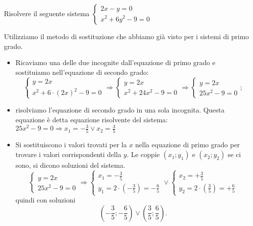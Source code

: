 \begin{esempio}{}{}
Risolvere il seguente sistema 
\(\left\{\begin{array}{l}{2x-y=0}\\{x^2+6y^2-9=0}\end{array}\right.\)

Utilizziamo il metodo di sostituzione che abbiamo già visto per i sistemi 
di primo grado.

\begin{itemize}
\item Ricaviamo una delle due incognite dall'equazione di primo grado e 
sostituiamo nell'equazione di secondo grado:
\[\left \{\begin{array}{l}y=2x \\
x^2+6 \cdot (2x)^2-9=0\end{array}\right. 
\Rightarrow \left \{\begin{array}{l}y=2x \\
x^2+24x^2-9=0\end{array}\right. 
\Rightarrow \left\{\begin{array}{l}y=2x \\
25x^2-9=0\end{array}\right.;\]
\item risolviamo l'equazione di secondo grado in una sola incognita. Questa equazione è detta equazione risolvente del sistema:
 \(25x^2-9=0\Rightarrow x_1=-\frac 3 5\vee x_2=\frac 3 5\)
\item Si sostituiscono i valori trovati per la \( x \) nella equazione di primo grado per trovare i valori corrispondenti della \( y \). Le coppie \((x_1;y_1)\) e \((x_2;y_2)\) se ci sono, si dicono soluzioni del sistema.
\[\left\{\begin{array}{l}{y=2x}\\
{25x^2-9=0}\end{array}\right. 
\Rightarrow \left\{\begin{array}{l}x_1=-\frac 3 5 \\
y_1=2\cdot \left(-\frac 3 5\right)=-\frac 6 5\end{array}\right.\vee 
\left\{\begin{array}{l}x_2=+\frac 3 5 \\
y_2=2\cdot \left(\frac 3 5\right)=+\frac 6 5 \end{array}\right.\] 
quindi con soluzioni 
\[\left(-\frac 3 5;-\frac 6 5\right)\vee \left(\frac 3 5;\frac 6 5\right).\]
\end{itemize}


\end{esempio}
